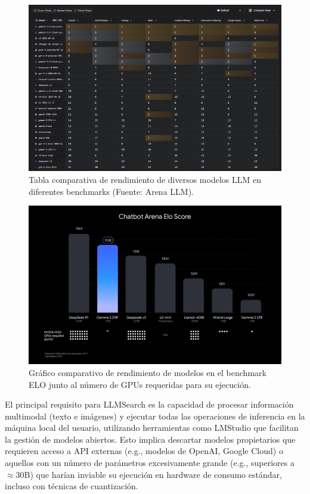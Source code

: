 \begin{figure}[H]
    \centering
    \includegraphics[width=\textwidth]{archivos/tabla_comparativa_modelos.png}
    \caption{Tabla comparativa de rendimiento de diversos modelos LLM en diferentes benchmarks (Fuente: Arena LLM).}
    \label{fig:tabla_comparativa_modelos}
\end{figure}

\begin{figure}[H]
    \centering
    \includegraphics[width=\textwidth]{archivos/elo_score_gemma_vs_deepseek.png}
    \caption{Gráfico comparativo de rendimiento de modelos en el benchmark ELO junto al número de GPUs requeridas para su ejecución.}
    \label{fig:graficas_rendimiento_modelos}
\end{figure}

El principal requisito para LLMSearch es la capacidad de procesar información multimodal (texto e imágenes) y ejecutar todas las operaciones de inferencia en la máquina local del usuario, utilizando herramientas como LMStudio que facilitan la gestión de modelos abiertos. Esto implica descartar modelos propietarios que requieren acceso a API externas (e.g., modelos de OpenAI, Google Cloud) o aquellos con un número de parámetros excesivamente grande (e.g., superiores a $\approx$30B) que harían inviable su ejecución en hardware de consumo estándar, incluso con técnicas de cuantización.

